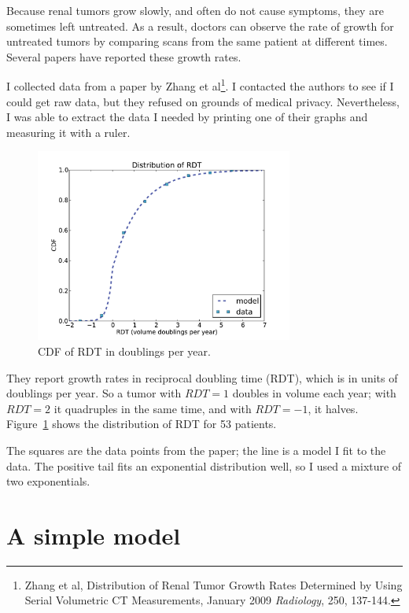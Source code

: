 \documentclass[12pt]{book}
\theoremstyle{exercise}
\begin{document}
Because renal tumors grow slowly, and often do not cause symptoms,
they are sometimes left untreated.  As a result, doctors can observe
the rate of growth for untreated tumors by comparing scans from the
same patient at different times.  Several papers have reported these
growth rates.

I collected data from a paper by Zhang et al\footnote{Zhang et al,
  Distribution of Renal Tumor Growth Rates Determined by Using Serial
  Volumetric CT Measurements, January 2009 {\it Radiology}, 250,
  137-144.}.  I contacted the authors to see if I could get raw data,
but they refused on grounds of medical privacy.  Nevertheless, I was
able to extract the data I needed by printing one of their graphs and
measuring it with a ruler.

\begin{figure}
\centerline{\includegraphics[height=2.5in]{figs/kidney2.pdf}}
\caption{CDF of RDT in doublings per year.}
\label{fig.kidney2}
\end{figure}

They report growth rates in reciprocal doubling time (RDT),
which is in units of doublings per year.  So a tumor with $RDT=1$
doubles in volume each year; with $RDT=2$ it quadruples in the same
time, and with $RDT=-1$, it halves.  Figure~\ref{fig.kidney2} shows the
distribution of RDT for 53 patients.

The squares are the data points from the paper; the line is a model I
fit to the data.  The positive tail fits an exponential distribution
well, so I used a mixture of two exponentials.



\section{A simple model}
\end{document}
